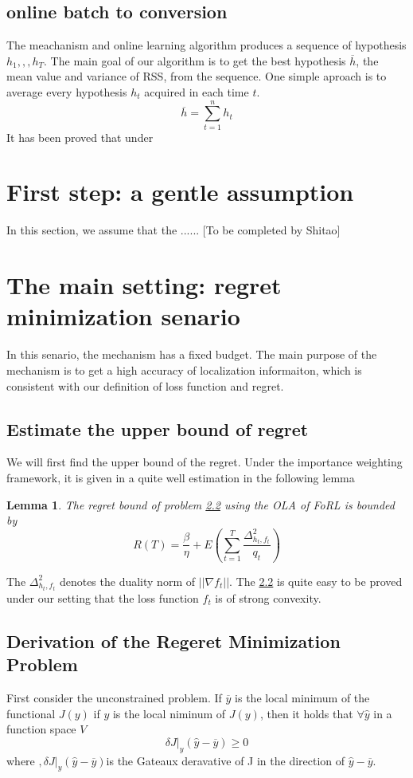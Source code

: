 \documentclass[10pt,conference,compsocconf,letterpaper]{IEEEtran}
\newtheorem{Lemma}{Lemma}
\begin{document}
\subsection{online batch to conversion}
The meachanism and online learning algorithm produces a sequence of hypothesis $h_1,,,h_T$. The main goal of our algorithm is to get the best hypothesis $\overline{h}$, the mean value and variance of RSS, from the sequence. One simple aproach is to average every hypothesis $h_t$ acquired in each time $t$.
\begin{equation}
\overline{h}=\sum_{t=1}^n h_t
\end{equation}
It has been proved that under 

\section{First step: a gentle assumption}
In this section, we assume that the ......
[To be completed by Shitao]

\section{The main setting: regret minimization senario}
In this senario, the mechanism has a fixed budget. The main purpose of the mechanism is to get a high accuracy of localization informaiton, which is consistent with our definition of loss function and regret. 
\subsection{Estimate the upper bound of regret}
We will first find the upper bound of the regret. Under the importance weighting framework, it is given in\cite{} a quite well estimation in the following lemma
\begin{Lemma}{}
The regret bound of problem \ref{} using the OLA of FoRL is bounded by
\[R(T)=\frac{\beta}{\eta}+E(\sum_{t=1}^T\frac{\Delta_{h_t,f_t}^2}{q_t})\]
\end{Lemma}
The $\Delta_{h_t,f_t}^2$ denotes the duality norm of $||\nabla f_t||$. The \ref{} is quite easy to be proved under our setting that the loss function $f_t$ is of strong convexity.
\subsection{Derivation of the Regeret Minimization Problem}
First consider the unconstrained problem. If $\overline{y}$ is the local minimum of the functional $J(y)$
if $y$ is the local niminum of $J(y)$, then it holds that $\forall \hat{y}$ in a function space $V$
\[\delta J|_y(\hat{y}-\overline{y})\geq 0\]
where $,\delta J|_y(\hat{y}-\overline{y})$is the Gateaux deravative of J in the direction of $\hat{y}-\overline{y}$. 
\end{document}

